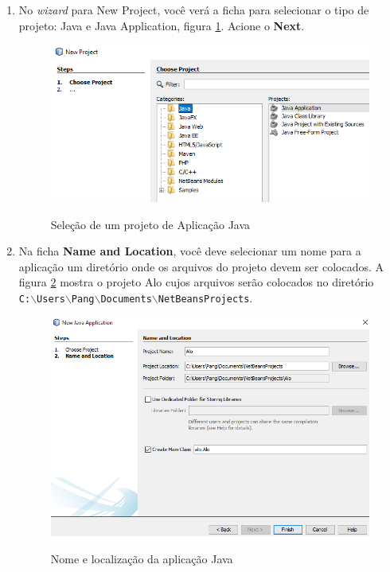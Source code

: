 \documentclass[
	12pt,				%
	twoside,			%
	a4paper,			%
	english,			%
	french,				%
	spanish,			%
	brazil				%
	]{abntex2}
\begin{document}
\begin{enumerate}
\item No \emph{wizard} para New Project, você verá a ficha para selecionar o tipo de projeto: Java e Java Application, figura \ref{fig:typeProj}. Acione o \textbf{Next}.
\begin{figure}[h]
\begin{center}
\includegraphics[scale=0.35]{newProj.png} 
\caption{Seleção de um projeto de Aplicação Java}
\label{fig:typeProj}
\end{center}
\end{figure}
\item Na ficha \textbf{Name and Location}, você deve selecionar um nome para a aplicação um diretório onde os arquivos do projeto devem ser colocados. A figura \ref{fig:nameProj} mostra o projeto Alo cujos arquivos serão colocados no diretório \\
\texttt{C:$\backslash$Users$\backslash$Pang$\backslash$Documents$\backslash$NetBeansProjects}.

\begin{figure}[h]
\begin{center}
\includegraphics[scale=0.3]{proj-step2.png} 
\caption{Nome e localização da aplicação Java}
\label{fig:nameProj}
\end{center}
\end{figure}


\end{enumerate}
\end{document}
